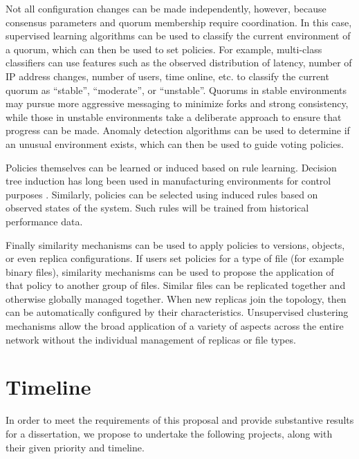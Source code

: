 \documentclass{article}
\begin{document}
Not all configuration changes can be made independently, however, because consensus parameters and quorum membership require coordination. In this case, supervised learning algorithms can be used to classify the current environment of a quorum, which can then be used to set policies. For example, multi-class classifiers \cite{qian2010recognition} can use features such as the observed distribution of latency, number of IP address changes, number of users, time online, etc. to classify the current quorum as ``stable'', ``moderate'', or ``unstable''. Quorums in stable environments may pursue more aggressive messaging to minimize forks and strong consistency, while those in unstable environments take a deliberate approach to ensure that progress can be made. Anomaly detection algorithms \cite{angiulli_fast_2002,dokas_data_2002} can be used to determine if an unusual environment exists, which can then be used to guide voting policies.

Policies themselves can be learned or induced based on rule learning. Decision tree induction has long been used in manufacturing environments for control purposes \cite{evans1994overcoming}. Similarly, policies can be selected using induced rules based on observed states of the system. Such rules will be trained from historical performance data.

Finally similarity mechanisms \cite{bhattacharya2006latent} can be used to apply policies to versions, objects, or even replica configurations. If users set policies for a type of file (for example binary files), similarity mechanisms can be used to propose the application of that policy to another group of files. Similar files can be replicated together and otherwise globally managed together. When new replicas join the topology, then can be automatically configured by their characteristics. Unsupervised clustering mechanisms allow the broad application of a variety of aspects across the entire network without the individual management of replicas or file types.

\section{Timeline}
\label{sec:timeline}

In order to meet the requirements of this proposal and provide substantive results for a dissertation, we propose to undertake the following projects, along with their given priority and timeline.
\end{document}
